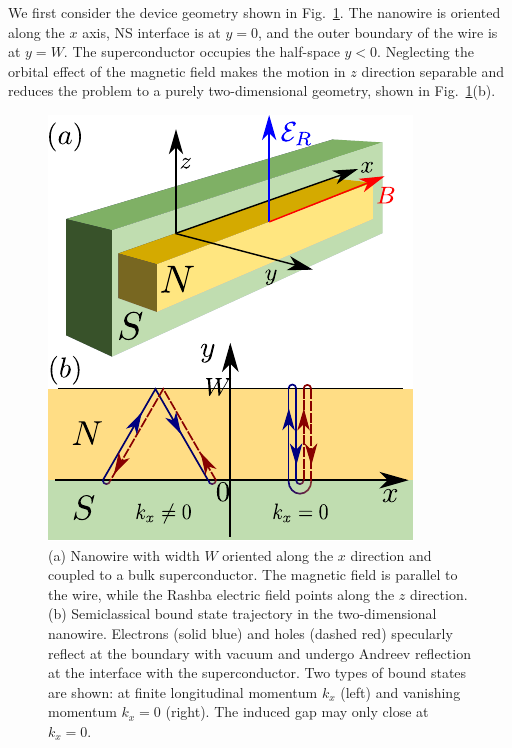 We first consider the device geometry shown in Fig.~\ref{fig:1stmodel}.
The nanowire is oriented along the $x$ axis, NS interface is at $y=0$, and the outer boundary of the wire is at $y=W$.
The superconductor occupies the half-space $y<0$.
Neglecting the orbital effect of the magnetic field makes the motion in $z$ direction separable and reduces the problem to a purely two-dimensional geometry, shown in Fig.~\ref{fig:1stmodel}(b).

\begin{figure}
\begin{center}
\includegraphics[width=0.5\columnwidth]{chapter_shortjunction/figures/3d.pdf}
\caption{(a) Nanowire with width $W$ oriented along the $x$ direction and coupled to a bulk superconductor.
The magnetic field is parallel to the wire, while the Rashba electric field points along the $z$ direction.
(b) Semiclassical bound state trajectory in the two-dimensional nanowire.
Electrons (solid blue) and holes (dashed red) specularly reflect at the boundary with vacuum and undergo Andreev reflection at the interface with the superconductor.
Two types of bound states are shown: at finite longitudinal momentum $k_x$ (left) and vanishing momentum $k_x=0$ (right).
The induced gap may only close at $k_x = 0$.}
\label{fig:1stmodel}
\end{center}
\end{figure}

